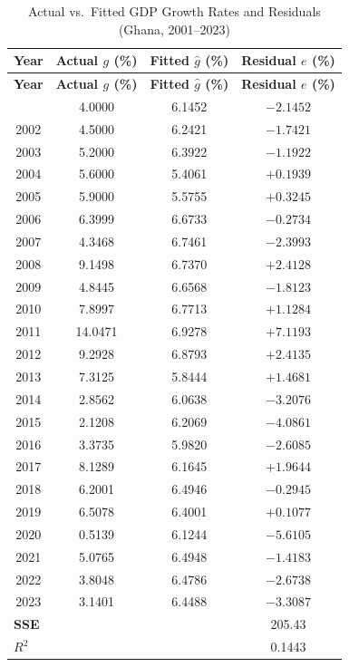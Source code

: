 \documentclass[12pt,a4paper]{report}
\theoremstyle{definition}
\theoremstyle{plain}
\theoremstyle{remark}
\begin{document}
	\begin{longtable}{cccc}
		\caption{Actual vs.\ Fitted GDP Growth Rates
			and Residuals (Ghana, 2001--2023)}
		\label{tab:app_fitted} \\
		\toprule
		\textbf{Year} &
		\textbf{Actual $g$ (\%)} &
		\textbf{Fitted $\hat{g}$ (\%)} &
		\textbf{Residual $e$ (\%)} \\
		\midrule
		\endfirsthead
		\toprule
		\textbf{Year} &
		\textbf{Actual $g$ (\%)} &
		\textbf{Fitted $\hat{g}$ (\%)} &
		\textbf{Residual $e$ (\%)} \\
		\midrule
		\endhead
		\bottomrule
		\endlastfoot
		2001 &  4.0000 &  6.1452 & $-2.1452$ \\
		2002 &  4.5000 &  6.2421 & $-1.7421$ \\
		2003 &  5.2000 &  6.3922 & $-1.1922$ \\
		2004 &  5.6000 &  5.4061 & $+0.1939$ \\
		2005 &  5.9000 &  5.5755 & $+0.3245$ \\
		2006 &  6.3999 &  6.6733 & $-0.2734$ \\
		2007 &  4.3468 &  6.7461 & $-2.3993$ \\
		2008 &  9.1498 &  6.7370 & $+2.4128$ \\
		2009 &  4.8445 &  6.6568 & $-1.8123$ \\
		2010 &  7.8997 &  6.7713 & $+1.1284$ \\
		2011 & 14.0471 &  6.9278 & $+7.1193$ \\
		2012 &  9.2928 &  6.8793 & $+2.4135$ \\
		2013 &  7.3125 &  5.8444 & $+1.4681$ \\
		2014 &  2.8562 &  6.0638 & $-3.2076$ \\
		2015 &  2.1208 &  6.2069 & $-4.0861$ \\
		2016 &  3.3735 &  5.9820 & $-2.6085$ \\
		2017 &  8.1289 &  6.1645 & $+1.9644$ \\
		2018 &  6.2001 &  6.4946 & $-0.2945$ \\
		2019 &  6.5078 &  6.4001 & $+0.1077$ \\
		2020 &  0.5139 &  6.1244 & $-5.6105$ \\
		2021 &  5.0765 &  6.4948 & $-1.4183$ \\
		2022 &  3.8048 &  6.4786 & $-2.6738$ \\
		2023 &  3.1401 &  6.4488 & $-3.3087$ \\
		\midrule
		\multicolumn{3}{l}{\textbf{SSE}} & 205.43 \\
		\multicolumn{3}{l}{\textbf{$R^2$}} & 0.1443 \\
	\end{longtable}
	
\end{document}
